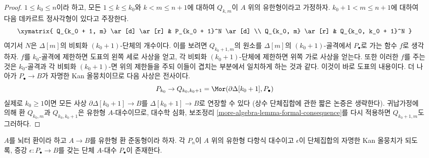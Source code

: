 \begin{proof}
\medskip\noindent
$1\leq k_0\leq n$이라 하고, 모든 $1\leq k\leq k_0$와
$k<m\leq n+1$에 대하여 $Q_{k,m}$이 $A$ 위의 유한형이라고 가정하자.
$k_0+1<m\leq n+1$에 대하여 다음 데카르트 정사각형이 있다고 주장한다.
$$
\xymatrix{
Q_{k_0 + 1, m} \ar[d] \ar[r] & P_{k_0 + 1}^N \ar[d] \\
Q_{k_0, m} \ar[r] & Q_{k_0, k_0 + 1}^N
}
$$
여기서 $N$은 $\Delta[m]$의 비퇴화 $(k_0+1)$-단체의 개수이다. 이를
보려면 $Q_{k_0+1,m}$의 원소를 $\Delta[m]$의 $(k_0+1)$-골격에서
$P_\bullet$로 가는 함수 $f$로 생각하자. $f$를 $k_0$-골격에 제한하면
도표의 왼쪽 세로 사상을 얻고, 각 비퇴화 $(k_0+1)$-단체에 제한하면 위쪽
가로 사상을 얻는다. 또한 이러한 $f$를 주는 것은 $k_0$-골격과 각 비퇴화
$(k_0+1)$-면 위의 제한들을 주되 이들이 겹치는 부분에서 일치하게 하는
것과 같다. 이것이 바로 도표의 내용이다. 더 나아가
$P_\bullet\to B$가 자명한 Kan 올뭉치이므로 다음 사상은 전사이다.
$$
P_{k_0} \to Q_{k_0, k_0 + 1} = \Mor(\partial \Delta[k_0 + 1], P_\bullet)
$$
실제로 $k_0\geq1$이면 모든 사상
$\partial\Delta[k_0+1]\to B$를 $\Delta[k_0+1]\to B$로 연장할 수 있다
(상수 단체집합에 관한 짧은 논증은 생략한다). 귀납가정에 의해 환
$Q_{k_0,m}$과 $Q_{k_0,k_0+1}$은 유한형 $A$-대수이므로, 대수학 심화,
보조정리 \ref{more-algebra-lemma-formal-consequence}를 다시 적용하면
$Q_{k_0+1,m}$도 그러하다.
\end{proof}

\begin{proposition}
\label{proposition-polynomial}
$A$를 뇌터 환이라 하고 $A\to B$를 유한형 환 준동형이라 하자. 각
$P_n$이 $A$ 위의 유한형 다항식 대수이고 $\epsilon$이 단체집합의 자명한
Kan 올뭉치가 되도록, 증강 $\epsilon:P_\bullet\to B$를 갖는 단체
$A$-대수 $P_\bullet$이 존재한다.
\end{proposition}

